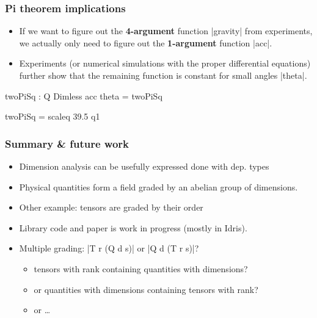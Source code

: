 \documentclass[aspectratio=169]{beamer}
\begin{document}
\begin{frame}
\frametitle{Pi theorem implications}
\begin{itemize}
\item If we want to figure out the \textbf{4-argument} function
  |gravity| from experiments, we actually only need to figure out the
  \textbf{1-argument} function |acc|.
\item Experiments (or numerical simulations with the proper
  differential equations) further show that the remaining function is
  constant for small angles |theta|.
\end{itemize}

\begin{code}
  twoPiSq : Q Dimless
  acc theta = twoPiSq

  twoPiSq = scaleq 39.5 q1
\end{code}

\end{frame}
\begin{frame}
\frametitle{Summary \& future work}
\begin{itemize}
\item Dimension analysis can be usefully expressed done with dep. types
\item Physical quantities form a field graded by an abelian group of
  dimensions.
\item Other example: tensors are graded by their order
\item Library code and paper is work in progress (mostly in Idris).
\item Multiple grading: |T r (Q d s)| or |Q d (T r s)|?
  \begin{itemize}
  \item tensors with rank containing quantities with dimensions?
  \item or quantities with dimensions containing tensors with rank?
  \item or \ldots{}
  \end{itemize}
\end{itemize}
\end{frame}
\end{document}

